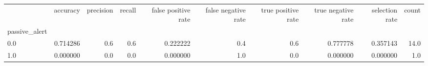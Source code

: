 \begin{tabular}{lrrrrrrrrr}
\toprule
{} &  accuracy &  precision &  recall &  false positive rate &  false negative rate &  true positive rate &  true negative rate &  selection rate &  count \\
passive\_alert &           &            &         &                      &                      &                     &                     &                 &        \\
\midrule
0.0           &  0.714286 &        0.6 &     0.6 &             0.222222 &                  0.4 &                 0.6 &            0.777778 &        0.357143 &   14.0 \\
1.0           &  0.000000 &        0.0 &     0.0 &             0.000000 &                  1.0 &                 0.0 &            0.000000 &        0.000000 &    1.0 \\
\bottomrule
\end{tabular}
